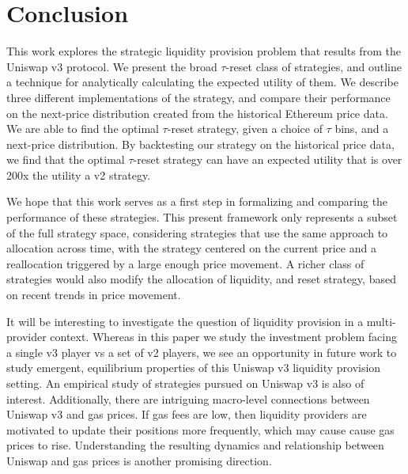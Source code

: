 \documentclass[sigconf, usenames, dvipsnames]{acmart}
\begin{document}





\section{Conclusion}\label{sec:conclusion}
This work explores the strategic liquidity provision problem that results from the Uniswap v3 protocol. We present the broad $\tau$-reset class of strategies, and outline a technique for analytically calculating the expected utility of them. We describe three different implementations of the strategy, and compare their performance on the next-price distribution created from the historical Ethereum price data. We are able to find the optimal $\tau$-reset strategy, given a choice of $\tau$ bins, and a next-price distribution. By backtesting our strategy on the historical price data, we find that the optimal $\tau$-reset strategy can have an expected utility that is over 200x the utility a v2 strategy. 



%
We hope that this work serves as a first step in formalizing and comparing the performance of these strategies. This present framework only represents a subset of the full strategy space, considering strategies that use the same approach to allocation across time, with the strategy centered on the current price and a reallocation triggered by a large enough price movement. A richer class of strategies would also modify the allocation of liquidity, and reset strategy, based on recent trends in price movement. 

It will be interesting to investigate the question of liquidity provision in a multi-provider context. 
Whereas in this paper we study the investment problem  facing a single v3 player vs a set of v2 players, we see an opportunity in future work to study emergent, equilibrium properties of this Uniswap v3 liquidity provision setting. An empirical study of strategies pursued on Uniswap v3 is also of interest. Additionally, there are intriguing macro-level  connections between Uniswap v3 and gas prices. If gas fees are low, then liquidity providers are motivated to update their positions more frequently, which may cause cause gas prices to rise. Understanding the resulting dynamics and relationship between Uniswap and gas prices is another promising direction.
\end{document}

